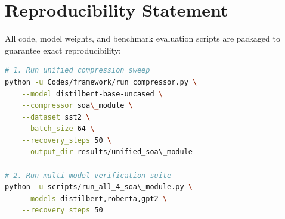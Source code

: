 \section{Reproducibility Statement}
All code, model weights, and benchmark evaluation scripts are packaged to guarantee exact reproducibility:
\begin{lstlisting}[language=bash]
# 1. Run unified compression sweep
python -u Codes/framework/run_compressor.py \
    --model distilbert-base-uncased \
    --compressor soa\_module \
    --dataset sst2 \
    --batch_size 64 \
    --recovery_steps 50 \
    --output_dir results/unified_soa\_module

# 2. Run multi-model verification suite
python -u scripts/run_all_4_soa\_module.py \
    --models distilbert,roberta,gpt2 \
    --recovery_steps 50
\end{lstlisting}
